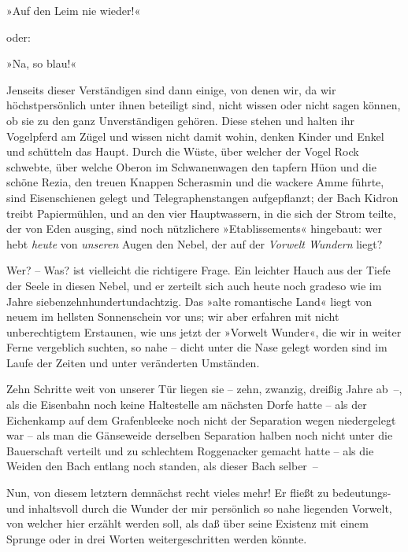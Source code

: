 \begin{center}
»Auf den Leim nie wieder!«
\end{center}

\noindent
oder:

\begin{center}
»Na, so blau!«
\end{center}

Jenseits dieser Verständigen sind dann einige, von denen wir, da
wir höchstpersönlich unter ihnen beteiligt sind, nicht wissen oder
nicht sagen können, ob sie zu den ganz Unverständigen gehören.
Diese stehen und halten ihr Vogelpferd am Zügel und wissen nicht
damit wohin, denken Kinder und Enkel und schütteln das Haupt. Durch
die Wüste, über welcher der Vogel Rock schwebte, über welche Oberon
im Schwanenwagen den tapfern Hüon und die schöne Rezia, den treuen
Knappen Scherasmin und die wackere Amme führte, sind Eisenschienen
gelegt und Telegraphenstangen aufgepflanzt; der Bach Kidron treibt
Papiermühlen, und an den vier Hauptwassern, in die sich der Strom
teilte, der von Eden ausging, sind noch nützlichere
»Etablissements« hingebaut: wer hebt \emph{heute} von
\emph{unseren} Augen den Nebel, der auf der \emph{Vorwelt Wundern}
liegt?

Wer? – Was? ist vielleicht die richtigere Frage. Ein leichter Hauch
aus der Tiefe der Seele in diesen Nebel, und er zerteilt sich auch
heute noch gradeso wie im Jahre siebenzehnhundertundachtzig. Das
»alte romantische Land« liegt von neuem im hellsten Sonnenschein
vor uns; wir aber erfahren mit nicht unberechtigtem Erstaunen, wie
uns jetzt der »Vorwelt Wunder«, die wir in weiter Ferne vergeblich
suchten, so nahe – dicht unter die Nase gelegt worden sind im Laufe
der Zeiten und unter veränderten Umständen.

Zehn Schritte weit von unserer Tür liegen sie – zehn, zwanzig,
dreißig Jahre ab~–, als die Eisenbahn noch keine Haltestelle am
nächsten Dorfe hatte – als der Eichenkamp auf dem Grafenbleeke noch
nicht der Separation wegen niedergelegt war – als man die
Gänseweide derselben Separation halben noch nicht unter die
Bauerschaft verteilt und zu schlechtem Roggenacker gemacht hatte –
als die Weiden den Bach entlang noch standen, als dieser Bach
selber~–

Nun, von diesem letztern demnächst recht vieles mehr! Er fließt zu
bedeutungs- und inhaltsvoll durch die Wunder der mir persönlich so
nahe liegenden Vorwelt, von welcher hier erzählt werden soll, als
daß über seine Existenz mit einem Sprunge oder in drei Worten
weitergeschritten werden könnte.

